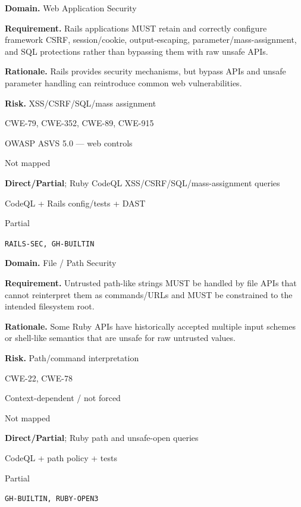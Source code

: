 \documentclass[10pt,letterpaper]{article}
\newcommand{\prioritybadge}[2]{\tcbox[on line,boxrule=0pt,arc=1.2mm,boxsep=0.7mm,left=1mm,right=1mm,top=0.4mm,bottom=0.4mm,colback=#2!12,coltext=#2]{\scriptsize\bfseries #1}}
\begin{document}
\begin{rulebox}[title={\texttt{SCS-RUBY-WEB-001} \hfill \prioritybadge{Critical Control}{Critical}}]
\textbf{Domain.} Web Application Security

\textbf{Requirement.} Rails applications MUST retain and correctly configure framework CSRF, session/cookie, output-escaping, parameter/mass-assignment, and SQL protections rather than bypassing them with raw unsafe APIs.

\textbf{Rationale.} Rails provides security mechanisms, but bypass APIs and unsafe parameter handling can reintroduce common web vulnerabilities.

\textbf{Risk.} XSS/CSRF/SQL/mass assignment

\begin{description}[leftmargin=2.65cm,labelwidth=2.3cm,style=nextline,itemsep=1pt,topsep=3pt]
  \item[CWE] CWE-79, CWE-352, CWE-89, CWE-915
  \item[OWASP] OWASP ASVS 5.0 --- web controls
  \item[CERT] Not mapped
  \item[CodeQL] \textbf{Direct/Partial}; Ruby CodeQL XSS/CSRF/SQL/mass-assignment queries
  \item[Enforcement] CodeQL + Rails config/tests + DAST
  \item[Automation] Partial
  \item[Sources] \texttt{RAILS-SEC, GH-BUILTIN}
\end{description}
\end{rulebox}

\begin{rulebox}[title={\texttt{SCS-RUBY-FILE-001} \hfill \prioritybadge{High Priority}{High}}]
\textbf{Domain.} File / Path Security

\textbf{Requirement.} Untrusted path-like strings MUST be handled by file APIs that cannot reinterpret them as commands/URLs and MUST be constrained to the intended filesystem root.

\textbf{Rationale.} Some Ruby APIs have historically accepted multiple input schemes or shell-like semantics that are unsafe for raw untrusted values.

\textbf{Risk.} Path/command interpretation

\begin{description}[leftmargin=2.65cm,labelwidth=2.3cm,style=nextline,itemsep=1pt,topsep=3pt]
  \item[CWE] CWE-22, CWE-78
  \item[OWASP] Context-dependent / not forced
  \item[CERT] Not mapped
  \item[CodeQL] \textbf{Direct/Partial}; Ruby path and unsafe-open queries
  \item[Enforcement] CodeQL + path policy + tests
  \item[Automation] Partial
  \item[Sources] \texttt{GH-BUILTIN, RUBY-OPEN3}
\end{description}
\end{rulebox}
\end{document}
